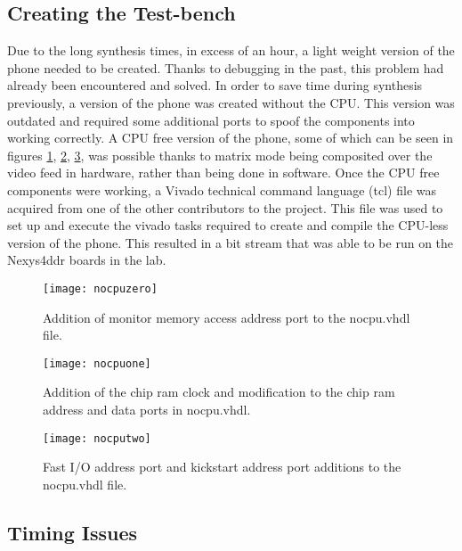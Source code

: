 \subsection{Creating the Test-bench}

\label{Ch5 Sec1 Sub1}

Due to the long synthesis times, in excess of an hour, a light weight version of the phone needed to be created. Thanks to debugging in the past, this problem had already been encountered and solved. In order to save time during synthesis previously, a version of the phone was created without the CPU. This version was outdated and required some additional ports to spoof the components into working correctly. A CPU free version of the phone, some of which can be seen in figures \ref{fig:nocpuzero}, \ref{fig:nocpuone}, \ref{fig:nocputwo}, was possible thanks to matrix mode being composited over the video feed in hardware, rather than being done in software. Once the CPU free components were working, a Vivado technical command language (tcl) file was acquired from one of the other contributors to the project. This file was used to set up and execute the vivado tasks required to create and compile the CPU-less version of the phone. This resulted in a bit stream that was able to be run on the Nexys4ddr boards in the lab.

\begin{figure}
  \centering
  \texttt{[image: nocpuzero]}
  \caption{Addition of monitor memory access address port to the nocpu.vhdl file.}
  \label{fig:nocpuzero}
\end{figure}

\begin{figure}
  \centering
  \texttt{[image: nocpuone]}
  \caption{Addition of the chip ram clock and modification to the chip ram address and data ports in nocpu.vhdl.}
  \label{fig:nocpuone}
\end{figure}

\begin{figure}
  \centering
  \texttt{[image: nocputwo]}
  \caption{Fast I/O address port and kickstart address port additions to the nocpu.vhdl file.}
  \label{fig:nocputwo}
\end{figure}

\subsection{Timing Issues}

